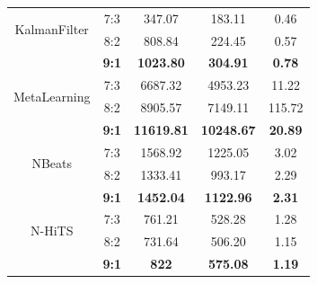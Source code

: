 \begin{table}[H]
\begin{tabular}{|c|c|c|c|c|}
         \hline
         \multirow{2}{*}{KalmanFilter} & 7:3 & 347.07&183.11& 0.46\\ & 8:2 & 808.84&224.45&0.57 \\ & \textbf{9:1} & \textbf{1023.80} & \textbf{304.91} & \textbf{0.78}\\
         \hline
         \multirow{2}{*}{MetaLearning} & 7:3 & 6687.32&4953.23&11.22\\ & 8:2 & 8905.57&7149.11&115.72 \\ & \textbf{9:1} & \textbf{11619.81} & \textbf{10248.67} & \textbf{20.89}\\
         \hline
         \multirow{2}{*}{NBeats} & 7:3 & 1568.92&1225.05&3.02\\ & 8:2 & 1333.41&993.17&2.29 \\ & \textbf{9:1} & \textbf{1452.04} & \textbf{1122.96} & \textbf{2.31}\\
         \hline
         \multirow{2}{*}{N-HiTS} & 7:3 & 761.21&528.28&1.28\\ & 8:2 & 731.64&506.20&1.15 \\ & \textbf{9:1} & \textbf{822} & \textbf{575.08} & \textbf{1.19}\\
         \hline
    \end{tabular}
    \label{bidvresult}
\end{table}

